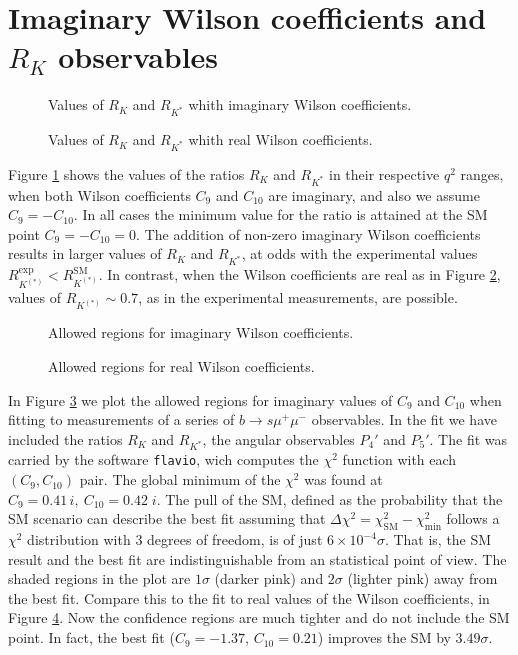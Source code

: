 \documentclass[11pt, a4paper]{article}
\begin{document}
\section{Imaginary Wilson coefficients and $R_K$ observables}
\begin{figure}[H]
\centering
\resizebox{0.6\textwidth}{!}{}
\caption{Values of $R_K$ and $R_{K^*}$ whith imaginary Wilson coefficients.}
\label{im:RK_im}
\end{figure}
\begin{figure}[H]
\centering
\resizebox{0.6\textwidth}{!}{}
\caption{Values of $R_K$ and $R_{K^*}$ whith real Wilson coefficients.}
\label{im:RK_re}
\end{figure}

 Figure \ref{im:RK_im} shows the values of the ratios $R_K$ and $R_{K^*}$ in their respective $q^2$ ranges, when both Wilson coefficients $C_9$ and $C_{10}$ are imaginary, and also we assume $C_9 = -C_{10}$. In all cases the minimum value for the ratio is attained at the SM point $C_9 = -C_{10} =0$. The addition of non-zero imaginary Wilson coefficients results in larger values of $R_K$ and $R_{K^*}$, at odds with the experimental values $R_{K^{(*)}}^{\mathrm{exp}} < R_{K^{(*)}}^{\mathrm{SM}}$. In contrast, when the Wilson coefficients are real as in Figure \ref{im:RK_re}, values of $R_{K^{(*)}} \sim 0.7$, as in the experimental measurements, are possible. 

\begin{figure}[H]
\centering
\resizebox{0.6\textwidth}{!}{}
\caption{Allowed regions for imaginary Wilson coefficients.}
\label{im:fitim}
\end{figure}
\begin{figure}[H]
\centering
\resizebox{0.6\textwidth}{!}{}
\caption{Allowed regions for real Wilson coefficients.}
\label{im:fitre}
\end{figure}

In Figure \ref{im:fitim} we plot the allowed regions for imaginary values of $C_9$ and $C_{10}$ when fitting to measurements of a series of $b\to s \mu^+\mu^-$ observables. In the fit we have included the ratios $R_K$ and $R_{K^*}$, the angular observables $P_4'$ and $P_5'$. The fit was carried by the software \texttt{flavio}, wich computes the $\chi^2$ function with each $(C_9, C_{10})$ pair. The global minimum of the $\chi^2$ was found at $C_9 = 0.41\,i,\ C_{10} = 0.42\;i$. The pull of the SM, defined as the probability that the SM scenario can describe the best fit assuming that $\Delta \chi^2 = \chi^2_{\mathrm{SM}} - \chi^2_{\mathrm{min}}$ follows a $\chi^2$ distribution with 3 degrees of freedom, is of just $6\times 10^{-4} \sigma$. That is, the SM result and the best fit are indistinguishable from an statistical point of view. The shaded regions in the plot are $1\sigma$ (darker pink) and $2\sigma$ (lighter pink) away from the best fit. Compare this to the fit to real values of the Wilson coefficients, in Figure \ref{im:fitre}. Now the confidence regions are much tighter and do not include the SM point. In fact, the best fit ($C_9 = -1.37$, $C_{10} = 0.21$) improves the SM by $3.49 \sigma$.
\end{document}
